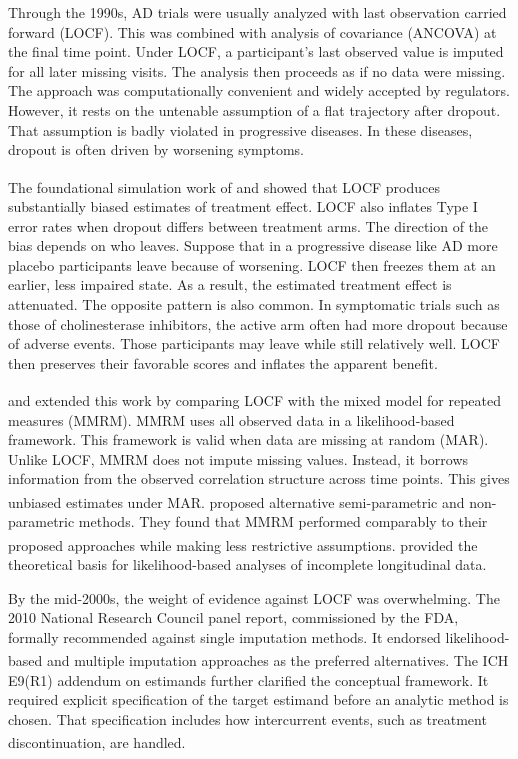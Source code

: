 \documentclass[
  11pt,
]{article}
\begin{document}
Through the 1990s, AD trials were usually analyzed with
last observation carried forward (LOCF). This was combined
with analysis of covariance (ANCOVA) at the final time
point. Under LOCF, a participant's last observed value is
imputed for all later missing visits. The analysis then
proceeds as if no data were missing. The approach was
computationally convenient and widely accepted by
regulators. However, it rests on the untenable assumption
of a flat trajectory after dropout. That assumption is
badly violated in progressive diseases. In these diseases,
dropout is often driven by worsening symptoms.

The foundational simulation work of\textsuperscript{} and\textsuperscript{} showed
that LOCF produces substantially biased estimates of
treatment effect. LOCF also inflates Type I error rates
when dropout differs between treatment arms. The direction
of the bias depends on who leaves. Suppose that in a
progressive disease like AD more placebo participants
leave because of worsening. LOCF then freezes them at an
earlier, less impaired state. As a result, the estimated
treatment effect is attenuated. The opposite pattern is
also common. In symptomatic trials such as those of
cholinesterase inhibitors, the active arm often had more
dropout because of adverse events. Those participants may
leave while still relatively well. LOCF then preserves
their favorable scores and inflates the apparent benefit.

\textsuperscript{} and\textsuperscript{}
extended this work by comparing LOCF with the mixed model
for repeated measures (MMRM). MMRM uses all observed data
in a likelihood-based framework. This framework is valid
when data are missing at random (MAR). Unlike LOCF, MMRM
does not impute missing values. Instead, it borrows
information from the observed correlation structure across
time points. This gives unbiased estimates under MAR.\textsuperscript{} proposed alternative
semi-parametric and non-parametric methods. They found
that MMRM performed comparably to their proposed
approaches while making less restrictive assumptions.\textsuperscript{} provided the theoretical basis
for likelihood-based analyses of incomplete longitudinal
data.

By the mid-2000s, the weight of evidence against LOCF was
overwhelming. The 2010 National Research Council panel
report, commissioned by the FDA, formally recommended
against single imputation methods. It endorsed
likelihood-based and multiple imputation approaches as the
preferred alternatives\textsuperscript{}. The ICH E9(R1)
addendum on estimands further clarified the conceptual
framework. It required explicit specification of the
target estimand before an analytic method is chosen. That
specification includes how intercurrent events, such as
treatment discontinuation, are handled\textsuperscript{}.
\end{document}
